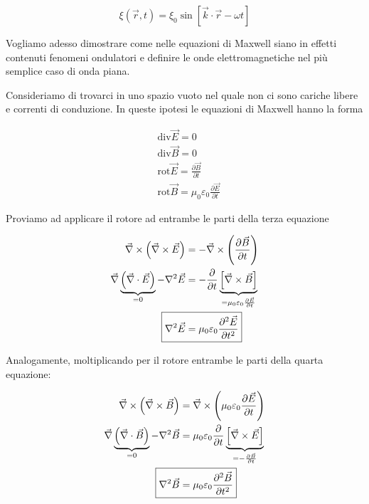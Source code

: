 \[
	\xi(\vec{r},t) = \xi_0\sin [\vec{k} \cdot \vec{r} -\omega t]
\]

Vogliamo adesso dimostrare come nelle equazioni di Maxwell siano in effetti contenuti fenomeni ondulatori e definire le onde elettromagnetiche nel più semplice caso di onda piana.

Consideriamo di trovarci in uno spazio vuoto nel quale non ci sono cariche libere e correnti di
conduzione. In queste ipotesi le equazioni di Maxwell hanno la forma

\begin{align}
	&\text{div}\vec{E} = 0 \\
	&\text{div}\vec{B} = 0 \\
	&\text{rot}\vec{E} = \frac{\partial \vec{B}}{\partial t} \\
	&\text{rot}\vec{B} = \mu_0 \varepsilon_0 \frac{\partial \vec{E}}{\partial t}
\end{align}

Proviamo ad applicare il rotore ad entrambe le parti della terza equazione

\begin{equation}
	\begin{aligned}
		\vec{\nabla} \times \left( \vec{\nabla} \times \vec{E} \right)   &= - \vec{\nabla} \times \left( \frac{\partial \vec{B}}{\partial t}  \right) \\
		\vec{\nabla} \underbrace{\left( \vec{\nabla} \cdot \vec{E} \right)}_{=0} - \nabla^2 \vec{E} &= - \frac{\partial}{\partial t} \underbrace{\left[\vec{\nabla} \times \vec{B} \right]}_{= \mu_0 \varepsilon_0 \frac{\partial \vec{E}}{\partial t}} \\
		\Aboxed{\nabla^2 \vec{E} &= \mu_0 \varepsilon_0 \frac{\partial^2 \vec{E}}{\partial t^2}}
	\end{aligned}
	\label{eq:maxwellElettrico}
\end{equation}

Analogamente, moltiplicando per il rotore entrambe le parti della quarta equazione:

\begin{equation}
	\begin{aligned}
		\vec{\nabla} \times \left( \vec{\nabla} \times \vec{B} \right)   &= \vec{\nabla} \times \left( \mu_0 \varepsilon_0 \frac{\partial \vec{E}}{\partial t}  \right) \\
		\vec{\nabla} \underbrace{\left( \vec{\nabla} \cdot \vec{B} \right)}_{=0} - \nabla^2 \vec{B} &= \mu_0 \varepsilon_0 \frac{\partial}{\partial t} \underbrace{\left[\vec{\nabla} \times \vec{E} \right]}_{= - \frac{\partial \vec{B}}{\partial t}} \\
		\Aboxed{\nabla^2 \vec{B} &= \mu_0 \varepsilon_0 \frac{\partial^2 \vec{B}}{\partial t^2}}
	\end{aligned}
	\label{eq:maxwellMagnetico}
\end{equation}

